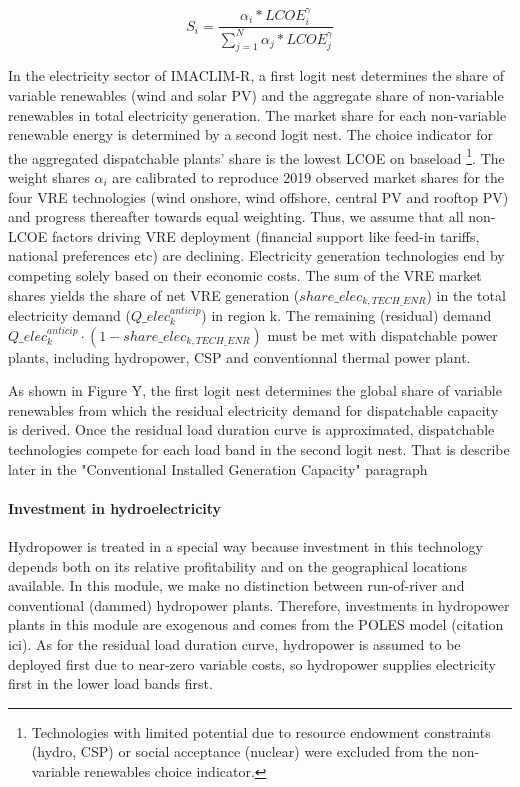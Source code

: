 {\begin{dmath}
    S_{i} = \frac{\alpha_{i}*LCOE_{i}^{\gamma}}{\sum_{j=1}^{N} \alpha_{j}*LCOE_{j}^{\gamma}}
    \label{eqn:MMLFVRE}
\end{dmath}

In the electricity sector of IMACLIM-R, a first logit nest determines the share of variable renewables (wind and solar PV) and the aggregate share of non-variable renewables in total electricity generation. The market share for each non-variable renewable energy is determined by a second logit nest.
 The choice indicator for the aggregated dispatchable plants’ share is the lowest LCOE on baseload 
\footnote{Technologies with limited potential due to resource endowment constraints (hydro, CSP) or social acceptance (nuclear) were excluded from the non-variable renewables choice indicator.}. The weight shares $\alpha_{i}$ are calibrated to reproduce 2019 observed market shares for the four VRE technologies (wind onshore, wind offshore, central PV and rooftop PV) and progress thereafter towards equal weighting. Thus, we assume that all non-LCOE factors driving VRE deployment (financial support like feed-in tariffs, national preferences etc) are declining. Electricity generation technologies end by competing solely based on their economic costs.
The sum of the VRE market shares yields the share of net VRE generation ($share\_elec_{k,TECH\_ENR}$) in the total electricity demand ($Q\_elec_k^{anticip}$)  in region k. The remaining (residual) demand $Q\_elec_k^{anticip} \cdot (1-share\_elec_{k,TECH\_ENR})$ must be met with dispatchable power plants, including hydropower, CSP and conventionnal thermal power plant.

As shown in Figure Y, the first logit nest determines the global share of variable renewables from which the residual electricity demand for dispatchable capacity is derived. Once the residual load duration curve is approximated, dispatchable technologies compete for each load band in the second logit nest. That is describe later in the "Conventional Installed Generation Capacity" paragraph


\paragraph{Investment in hydroelectricity}

Hydropower is treated in a special way because investment in this technology depends both on its relative profitability and on the  geographical locations available.
In this module, we make no distinction between run-of-river and conventional (dammed) hydropower plants. Therefore, investments in hydropower plants in this module are exogenous and comes from the POLES model (citation ici).
As for the residual load duration curve, hydropower is assumed to be deployed first due to near-zero variable costs, so hydropower supplies electricity first in the lower load bands first.


}
